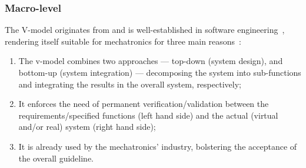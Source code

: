 \subsubsection{Macro-level}
The V-model
originates from and is
well-established in software engineering~\cite{brohl1993v}, rendering itself
suitable for mechatronics for three main reasons~\cite{gausemeier2003new}:
\begin{enumerate}
  \item The v-model combines two approaches --- top-down (system design), and
    bottom-up (system integration) --- decomposing the system into sub-functions
    and integrating the results in the overall system, respectively;
  \item It enforces the need of permanent verification/validation between the
    requirements/specified functions (left hand side) and the actual (virtual
    and/or real) system (right hand side);
  \item It is already used by the mechatronics' industry, bolstering the
    acceptance of the overall guideline.
\end{enumerate}

